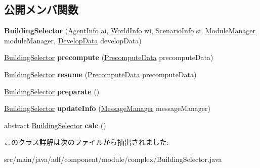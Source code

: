 \subsection*{公開メンバ関数}
\begin{DoxyCompactItemize}
\item 
\hypertarget{classadf_1_1component_1_1module_1_1complex_1_1BuildingSelector_accb98a3dc072b53332144c0570eea713}{}\label{classadf_1_1component_1_1module_1_1complex_1_1BuildingSelector_accb98a3dc072b53332144c0570eea713} 
{\bfseries Building\+Selector} (\hyperlink{classadf_1_1agent_1_1info_1_1AgentInfo}{Agent\+Info} ai, \hyperlink{classadf_1_1agent_1_1info_1_1WorldInfo}{World\+Info} wi, \hyperlink{classadf_1_1agent_1_1info_1_1ScenarioInfo}{Scenario\+Info} si, \hyperlink{classadf_1_1agent_1_1module_1_1ModuleManager}{Module\+Manager} module\+Manager, \hyperlink{classadf_1_1agent_1_1develop_1_1DevelopData}{Develop\+Data} develop\+Data)
\item 
\hypertarget{classadf_1_1component_1_1module_1_1complex_1_1BuildingSelector_afe2f19fe29b3a57e3df4a003923d9cdf}{}\label{classadf_1_1component_1_1module_1_1complex_1_1BuildingSelector_afe2f19fe29b3a57e3df4a003923d9cdf} 
\hyperlink{classadf_1_1component_1_1module_1_1complex_1_1BuildingSelector}{Building\+Selector} {\bfseries precompute} (\hyperlink{classadf_1_1agent_1_1precompute_1_1PrecomputeData}{Precompute\+Data} precompute\+Data)
\item 
\hypertarget{classadf_1_1component_1_1module_1_1complex_1_1BuildingSelector_ab23c92d96da847e1a9218a7fb50e6098}{}\label{classadf_1_1component_1_1module_1_1complex_1_1BuildingSelector_ab23c92d96da847e1a9218a7fb50e6098} 
\hyperlink{classadf_1_1component_1_1module_1_1complex_1_1BuildingSelector}{Building\+Selector} {\bfseries resume} (\hyperlink{classadf_1_1agent_1_1precompute_1_1PrecomputeData}{Precompute\+Data} precompute\+Data)
\item 
\hypertarget{classadf_1_1component_1_1module_1_1complex_1_1BuildingSelector_a01457e08066eb8bf50fe521df437c03e}{}\label{classadf_1_1component_1_1module_1_1complex_1_1BuildingSelector_a01457e08066eb8bf50fe521df437c03e} 
\hyperlink{classadf_1_1component_1_1module_1_1complex_1_1BuildingSelector}{Building\+Selector} {\bfseries preparate} ()
\item 
\hypertarget{classadf_1_1component_1_1module_1_1complex_1_1BuildingSelector_af80b6a108c9d3741c2e8d11b4fb3cf98}{}\label{classadf_1_1component_1_1module_1_1complex_1_1BuildingSelector_af80b6a108c9d3741c2e8d11b4fb3cf98} 
\hyperlink{classadf_1_1component_1_1module_1_1complex_1_1BuildingSelector}{Building\+Selector} {\bfseries update\+Info} (\hyperlink{classadf_1_1agent_1_1communication_1_1MessageManager}{Message\+Manager} message\+Manager)
\item 
\hypertarget{classadf_1_1component_1_1module_1_1complex_1_1BuildingSelector_a4366ea9047a409d4b96d78aa976b6781}{}\label{classadf_1_1component_1_1module_1_1complex_1_1BuildingSelector_a4366ea9047a409d4b96d78aa976b6781} 
abstract \hyperlink{classadf_1_1component_1_1module_1_1complex_1_1BuildingSelector}{Building\+Selector} {\bfseries calc} ()
\end{DoxyCompactItemize}


このクラス詳解は次のファイルから抽出されました\+:\begin{DoxyCompactItemize}
\item 
src/main/java/adf/component/module/complex/Building\+Selector.\+java\end{DoxyCompactItemize}
